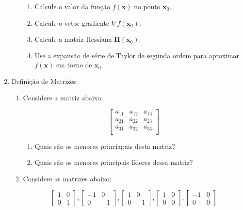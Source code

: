 \documentclass{article}
\begin{document}
\begin{enumerate}
\begin{enumerate}
    \begin{enumerate}
        \item Calcule o valor da função \(f(\mathbf{x})\) no ponto \(\mathbf{x}_0\).
        \item Calcule o vetor gradiente \(\nabla f(\mathbf{x}_0)\).
        \item Calcule a matriz Hessiana \(\mathbf{H}(\mathbf{x}_0)\).
        \item Use a expansão de série de Taylor de segunda ordem para aproximar \(f(\mathbf{x})\) em torno de \(\mathbf{x}_0\).
    \end{enumerate}



    \end{enumerate}
    \item Definição de Matrizes
    \begin{enumerate}
        \item Considere a matriz abaixo:
        
                \[
                \begin{bmatrix}
                a_{11} & a_{12} & a_{13} \\
                a_{21} & a_{22} & a_{23} \\
                a_{31} & a_{32} & a_{33} \\
                \end{bmatrix}
                \]
            \begin{enumerate}
                \item Quais são os menores princiapais desta matriz?
                \item Quais são os menores principais líderes dessa matriz?
            \end{enumerate}
        \item Considere as matrizes abaixo:
        
        \[
                \begin{bmatrix}
                1 & 0 \\
                0 & 1 
                \end{bmatrix} , 
                \begin{bmatrix}
                -1 & 0 \\
                0 & -1 
                \end{bmatrix},  
                \begin{bmatrix}
                    1 & 0 \\
                    0 & -1
                \end{bmatrix} ,
                \begin{bmatrix}
                    1 & 0 \\
                    0 & 0
                \end{bmatrix} ,
                \begin{bmatrix}
                    -1 & 0 \\
                    0 & 0
                \end{bmatrix}
        \]


\end{enumerate}
\end{enumerate}
\end{document}
